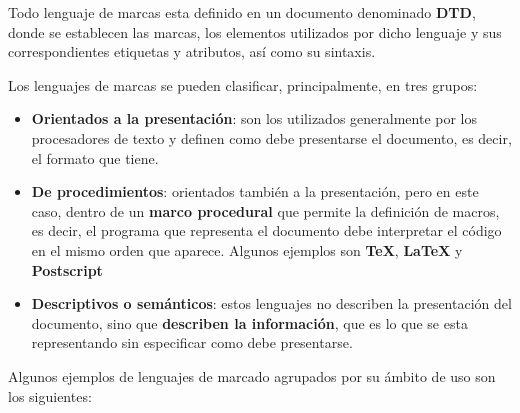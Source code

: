 Todo lenguaje de marcas esta definido en un documento denominado \textbf{\gls{DTD}}, donde se establecen las marcas, los elementos utilizados por dicho lenguaje y sus correspondientes etiquetas y atributos, así como su sintaxis.

Los lenguajes de marcas se pueden clasificar, principalmente, en tres grupos:

\begin{itemize}
    \item \textbf{Orientados a la presentación}: son los utilizados generalmente por los procesadores de texto y definen como debe presentarse el documento, es decir, el formato que tiene.
    \item \textbf{De procedimientos}: orientados también a la presentación, pero en este caso, dentro de un \textbf{marco procedural} que permite la definición de macros, es decir, el programa que representa el documento debe interpretar el código en el mismo orden que aparece. Algunos ejemplos son \textbf{TeX}, \textbf{LaTeX} y \textbf{Postscript}
    \item \textbf{Descriptivos o semánticos}: estos lenguajes no describen la presentación del documento, sino que \textbf{describen la información}, que es lo que se esta representando sin especificar como debe presentarse.
\end{itemize}

Algunos ejemplos de lenguajes de marcado agrupados por su ámbito de uso son los siguientes:

